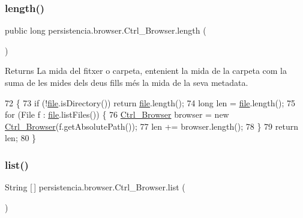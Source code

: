 \subsubsection{\texorpdfstring{length()}{length()}}
{\footnotesize\ttfamily public long persistencia.\+browser.\+Ctrl\+\_\+\+Browser.\+length (\begin{DoxyParamCaption}{ }\end{DoxyParamCaption})\hspace{0.3cm}{\ttfamily [inline]}}

\begin{DoxyReturn}{Returns}
La mida del fitxer o carpeta, entenient la mida de la carpeta com la suma de les mides dels deus fills més la mida de la seva metadata. 
\end{DoxyReturn}

\begin{DoxyCode}
72                          \{
73         \textcolor{keywordflow}{if} (!\hyperlink{classpersistencia_1_1browser_1_1Ctrl__Browser_a72c151aed575c0848f7dbb1609b373c8}{file}.isDirectory()) \textcolor{keywordflow}{return} \hyperlink{classpersistencia_1_1browser_1_1Ctrl__Browser_a72c151aed575c0848f7dbb1609b373c8}{file}.length();
74         \textcolor{keywordtype}{long} len = \hyperlink{classpersistencia_1_1browser_1_1Ctrl__Browser_a72c151aed575c0848f7dbb1609b373c8}{file}.length();
75         \textcolor{keywordflow}{for} (File f : \hyperlink{classpersistencia_1_1browser_1_1Ctrl__Browser_a72c151aed575c0848f7dbb1609b373c8}{file}.listFiles()) \{
76             \hyperlink{classpersistencia_1_1browser_1_1Ctrl__Browser_a6cd8687a9748fc4c169d1d72be7081b1}{Ctrl\_Browser} browser = \textcolor{keyword}{new} \hyperlink{classpersistencia_1_1browser_1_1Ctrl__Browser_a6cd8687a9748fc4c169d1d72be7081b1}{Ctrl\_Browser}(f.getAbsolutePath());
77             len += browser.length();
78         \}
79         \textcolor{keywordflow}{return} len;
80     \}
\end{DoxyCode}
\mbox{\label{classpersistencia_1_1browser_1_1Ctrl__Browser_abbf52c645a931fb8e5f727c2c99af97a}} 
\subsubsection{\texorpdfstring{list()}{list()}}
{\footnotesize\ttfamily String \mbox{[}$\,$\mbox{]} persistencia.\+browser.\+Ctrl\+\_\+\+Browser.\+list (\begin{DoxyParamCaption}{ }\end{DoxyParamCaption})\hspace{0.3cm}{\ttfamily [inline]}}


